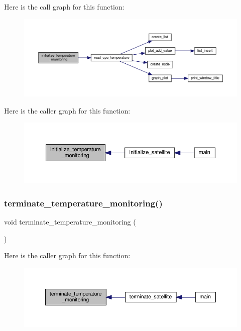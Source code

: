 Here is the call graph for this function\+:\nopagebreak
\begin{figure}[H]
\begin{center}
\leavevmode
\includegraphics[width=350pt]{temperature-monitoring_8h_a1d2bab81a3e6aa84eb0c2e0172594299_cgraph}
\end{center}
\end{figure}
Here is the caller graph for this function\+:\nopagebreak
\begin{figure}[H]
\begin{center}
\leavevmode
\includegraphics[width=350pt]{temperature-monitoring_8h_a1d2bab81a3e6aa84eb0c2e0172594299_icgraph}
\end{center}
\end{figure}
\mbox{\label{temperature-monitoring_8h_a8b1be00dadac2a3d808233430fb2cf8b}} 
\subsubsection{\texorpdfstring{terminate\+\_\+temperature\+\_\+monitoring()}{terminate\_temperature\_monitoring()}}
{\footnotesize\ttfamily void terminate\+\_\+temperature\+\_\+monitoring (\begin{DoxyParamCaption}{ }\end{DoxyParamCaption})}

Here is the caller graph for this function\+:\nopagebreak
\begin{figure}[H]
\begin{center}
\leavevmode
\includegraphics[width=350pt]{temperature-monitoring_8h_a8b1be00dadac2a3d808233430fb2cf8b_icgraph}
\end{center}
\end{figure}


